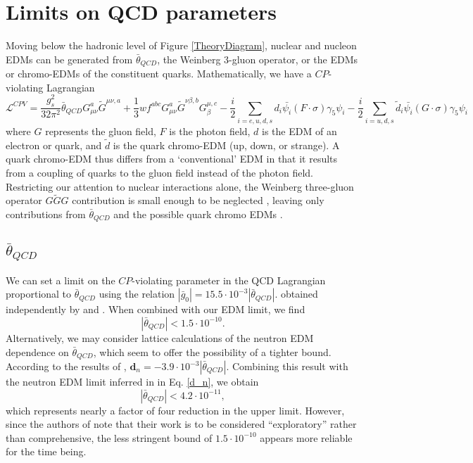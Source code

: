 \documentclass [10pt, twoside] {uwthesis}[2012/04/02]
\begin{document}
\section{Limits on QCD parameters} 
Moving below the hadronic level of Figure \ref{TheoryDiagram}, nuclear and nucleon EDMs can be generated from $\bar{\theta}_{QCD}$, the Weinberg 3-gluon operator, or the EDMs or chromo-EDMs of the constituent quarks. Mathematically, we have a $CP$-violating Lagrangian \cite{2002_Pospelov_quark_chromo_EDM}
\begin{equation} \label{CPV_Lagrangian}
\mathcal{L}^{CPV} = \dfrac{g_s^2}{32\pi^2} \bar{\theta}_{QCD} G^a_{\mu\nu} \widetilde{G}^{\mu\nu,a} + \dfrac{1}{3}w f^{abc} G^a_{\mu\nu} \widetilde{G}^{\nu\beta,b} G_{\beta}^{\mu,c} -\dfrac{i}{2} \sum_{i=e,u,d,s} d_i \bar{\psi_i} (F \cdot\sigma) \gamma_5 \psi_i - \dfrac{i}{2} \sum_{i=u,d,s} \widetilde{d}_i  \bar{\psi_i} (G \cdot\sigma) \gamma_5 \psi_i
\end{equation} 
where $G$ represents the gluon field, $F$ is the photon field, $d$ is the EDM of an electron or quark, and $\widetilde{d}$ is the quark chromo-EDM (up, down, or strange). A quark chromo-EDM thus differs from a `conventional' EDM in that it results from a coupling of quarks to the gluon field instead of the photon field. Restricting our attention to nuclear interactions alone, the Weinberg three-gluon operator $G\widetilde{G}G$ contribution is small enough to be neglected , leaving only contributions from $\bar{\theta}_{QCD}$ and the possible quark chromo EDMs \cite{2002_Pospelov_quark_chromo_EDM}.

\subsection{$\bar{\theta}_{QCD}$}
We can set a limit on the $CP$-violating parameter in the QCD Lagrangian proportional to $\bar{\theta}_{QCD}$ using the relation $|\bar{g}_0| = 15.5\cdot 10^{-3}|\bar{\theta}_{QCD}|$. obtained independently by \cite{2015_deVries_Mereghetti_Walker_CP_violation_in_CPT} and \cite{2015_Bsaisou_et_al_Nucleon_EDMs_in_chiral_EFT}. When combined with our EDM limit, we find
\begin{equation} 
|\bar{\theta}_{QCD}| < 1.5\cdot 10^{-10}.
\end{equation}
Alternatively, we may consider lattice calculations of the neutron EDM dependence on $\bar{\theta}_{QCD}$, which seem to offer the possibility of a tighter bound. According to the results of \cite{2015_Guo_et_al_nEDM_from_lattice_QCD}, $\mathbf{d}_n = -3.9\cdot 10^{-3}|\bar{\theta}_{QCD}|$. Combining this result with the neutron EDM limit inferred in in Eq. \ref{d_n}, we obtain  
\begin{equation}
|\bar{\theta}_{QCD}| < 4.2\cdot 10^{-11},
\end{equation}
which represents nearly a factor of four reduction in the upper limit. However, since the authors of \cite{2015_Guo_et_al_nEDM_from_lattice_QCD} note that their work is to be considered ``exploratory'' rather than comprehensive, the less stringent bound of $1.5\cdot 10^{-10}$ appears more reliable for the time being.
\end{document}
